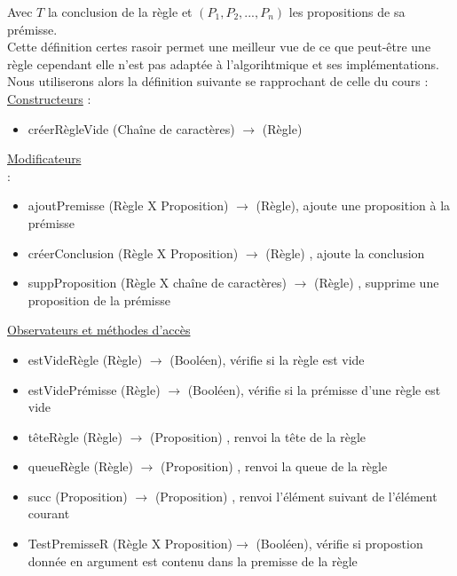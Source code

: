 \documentclass{article}
\begin{document}
Avec $T$ la conclusion de la règle et $(P_1,P_2,...,P_n)$ les propositions de sa prémisse.\\


Cette définition certes rasoir permet une meilleur vue de ce que peut-être une règle cependant elle n'est pas adaptée à l'algorihtmique et ses implémentations.\\\clearpage
Nous utiliserons alors la définition suivante se rapprochant de celle du cours : \\

\underline{Constructeurs} : 

\begin{itemize}
    \item créerRègleVide (Chaîne de caractères) $\longrightarrow$ (Règle)\\
\end{itemize}

\underline{Modificateurs\\} : 

\begin{itemize}
    \item ajoutPremisse (Règle X Proposition) $\longrightarrow$ (Règle), ajoute une proposition à la prémisse
    \item créerConclusion (Règle X Proposition) $\longrightarrow$ (Règle) , ajoute la conclusion
    \item suppProposition (Règle X chaîne de caractères) $\longrightarrow$ (Règle) , supprime une proposition de la prémisse\\
\end{itemize}
\underline{Observateurs et méthodes d'accès}
\begin{itemize}
    \item estVideRègle (Règle) $\longrightarrow$ (Booléen), vérifie si la règle est vide
    \item estVidePrémisse (Règle) $\longrightarrow$ (Booléen), vérifie si la prémisse d'une règle est vide
    \item têteRègle (Règle) $\longrightarrow$ (Proposition) , renvoi la tête de la règle
    \item queueRègle (Règle) $\longrightarrow$ (Proposition) , renvoi la queue de la règle
    \item succ (Proposition) $\longrightarrow$ (Proposition) , renvoi l'élément suivant de l'élément courant
    \item TestPremisseR (Règle X Proposition)$\longrightarrow$ (Booléen), vérifie si propostion donnée en argument est contenu dans la premisse de la règle 
\end{itemize}
\end{document}
